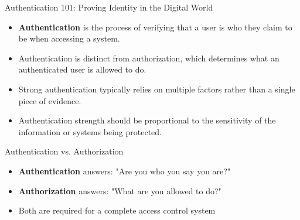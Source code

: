 \documentclass{beamer}
\begin{document}
\begin{frame}{Authentication 101: Proving Identity in the Digital World}
    \begin{itemize}
        \item \textbf{Authentication} is the process of verifying that a user is who they claim to be when accessing a system.
        \item Authentication is distinct from authorization, which determines what an authenticated user is allowed to do.
        \item Strong authentication typically relies on multiple factors rather than a single piece of evidence.
        \item Authentication strength should be proportional to the sensitivity of the information or systems being protected.
    \end{itemize}
    
    \begin{block}{Authentication vs. Authorization}
        \begin{itemize}
            \item \textbf{Authentication} answers: "Are you who you say you are?"
            \item \textbf{Authorization} answers: "What are you allowed to do?"
            \item Both are required for a complete access control system
        \end{itemize}
    \end{block}
\end{frame}
\end{document}
